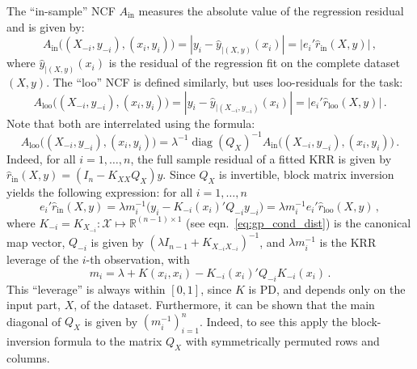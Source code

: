 \documentclass[a4paper,14pt]{article}
\newcommand{\Xcal}{\mathcal{X}}
\newcommand{\Real}{\mathbb{R}}
\newcommand{\diag}{\mathop{\text{diag}}\nolimits}
\begin{document}
The ``in-sample'' NCF $A_{\text{in}}$ measures the absolute value of the regression
residual and is given by:
$$ A_{\text{in}}\bigl((X_{-i}, y_{-i}), (x_i, y_i)\bigr)
  = |y_i - \hat{y}_{|(X, y)}(x_i)| = |e_i' \hat{r}_{\text{in}}(X, y)|
  \,, $$
where $\hat{y}_{|(X, y)}(x_i)$ is the residual of the regression fit on the complete
dataset $(X, y)$. The ``loo'' NCF is defined similarly, but uses loo-residuals for
the task:
$$ A_{\text{loo}}\bigl((X_{-i}, y_{-i}), (x_i, y_i)\bigr)
  = |y_i - \hat{y}_{|(X_{-i}, y_{-i})}(x_i)| = |e_i' \hat{r}_{\text{loo}}(X, y)|
  \,. $$
Note that both are interrelated using the formula:
$$ A_{\text{loo}}\bigl((X_{-i}, y_{-i}), (x_i, y_i)\bigr)
  = \lambda^{-1} \diag(Q_X)^{-1}
  A_{\text{in}}\bigl((X_{-i}, y_{-i}), (x_i, y_i)\bigr)
  \,. $$
Indeed, for all $i=1,\ldots,n$, the full sample residual of a fitted KRR is given
by $\hat{r}_{\text{in}}(X, y) = (I_n - K_{XX} Q_X) y$. Since $Q_X$ is invertible,
block matrix inversion yields the following expression: for all $i=1,\ldots, n$
\begin{equation} \label{eq:loo_resid}
  e_i' \hat{r}_{\text{in}}(X, y)
  = \lambda m_i^{-1} \bigl(y_i - K_{-i}(x_i)' Q_{-i} y_{-i} \bigr)
  = \lambda m_i^{-1} e_i' \hat{r}_{\text{loo}}(X, y) \,,
\end{equation}
where $K_{-i} = K_{X_{-i}}: \Xcal \mapsto \Real^{(n-1)\times1}$ (see eqn.~\ref{eq:gp_cond_dist})
is the canonical map vector, $Q_{-i}$ is given by $(\lambda I_{n-1} + K_{X_{-i}X_{-i}})^{-1}$,
and $\lambda m_i^{-1}$ is the KRR leverage of the $i$-th observation, with
$$ m_i = \lambda + K(x_i, x_i) - K_{-i}(x_i)' Q_{-i} K_{-i}(x_i) \,. $$
This ``leverage'' is always within $[0,1]$, since $K$ is PD, and depends only on
the input part, $X$, of the dataset. Furthermore, it can be shown that the main
diagonal of $Q_X$ is given by $(m_i^{-1})_{i=1}^n$. Indeed, to see this apply the
block-inversion formula to the matrix $Q_X$ with symmetrically permuted rows and
columns.
\end{document}
